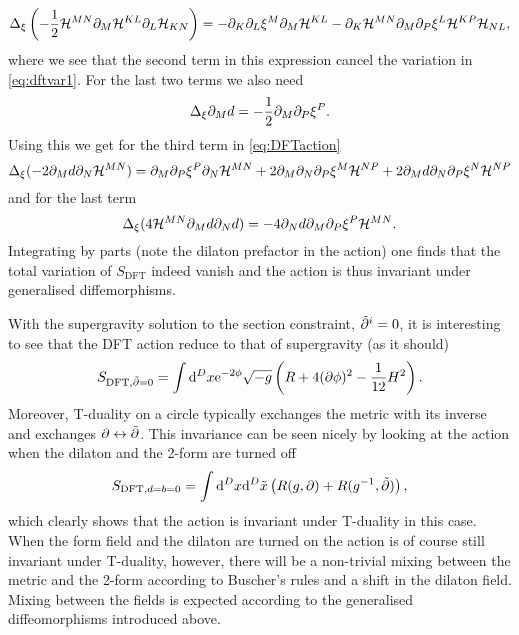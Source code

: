 \begin{equation}
    \Delta_\xi \left(-\frac{1}{2}\mathcal{H}^{MN}\partial_M\mathcal{H}^{KL}\partial_L\mathcal{H}_{KN}\right) = -\partial_K\partial_L\xi^M\partial_M\mathcal{H}^{KL}-\partial_K\mathcal{H}^{MN}\partial_M\partial_P\xi^L\mathcal{H}^{KP}\mathcal{H}_{NL},
\end{equation}
where we see that the second term in this expression cancel the variation in \eqref{eq:dftvar1}. For the last two terms we also need
\begin{equation}
    \Delta_\xi \partial_M d = -\frac{1}{2}\partial_M\partial_P\xi^P.
\end{equation}
Using this we get for the third term in \eqref{eq:DFTaction}
\begin{equation}
    \Delta_\xi (-2\partial_Md\partial_N\mathcal{H}^{MN}) = \partial_M\partial_P\xi^P\partial_N\mathcal{H}^{MN}+2\partial_M\partial_N\partial_P\xi^M\mathcal{H}^{NP}+2\partial_M d\partial_N\partial_P\xi^N\mathcal{H}^{NP}
\end{equation}
and for the last term
\begin{equation}
    \Delta_\xi (4\mathcal{H}^{MN}\partial_Md\partial_Nd) = -4\partial_N d\partial_M\partial_P\xi^P\mathcal{H}^{MN}.
\end{equation}
Integrating by parts (note the dilaton prefactor in the action) one finds that the total variation of $S_{\text{DFT}}$ indeed vanish and the action is thus invariant under generalised diffemorphisms. 


With the supergravity solution to the section constraint, $\tilde{\partial}^i = 0$, it is interesting to see that the DFT action reduce to that of supergravity (as it should)
\begin{equation}
    S_{\text{DFT},\tilde{\partial}=0} = \int\mathrm{d}^Dx \mathrm{e}^{-2\phi}\sqrt{-g}\left(R+4(\partial\phi)^2-\frac{1}{12}H^2\right).
\end{equation}
Moreover, T-duality on a circle typically exchanges the metric with its inverse and exchanges $\partial\leftrightarrow\tilde{\partial}$. This invariance can be seen nicely by looking at the action when the dilaton and the 2-form are turned off 
\begin{equation}
    S_{\text{DFT},d=b=0} = \int\mathrm{d}^Dx\mathrm{d}^D\tilde{x}\left(R(g,\partial)+R(g^{-1},\tilde{\partial})\right),
\end{equation}
which clearly shows that the action is invariant under T-duality in this case. When the form field and the dilaton are turned on the action is of course still invariant under T-duality, however, there will be a non-trivial mixing between the metric and the 2-form according to Buscher's rules \cite{Blumenhagen2013} and a shift in the dilaton field. Mixing between the fields is expected according to the generalised diffeomorphisms introduced above. 



